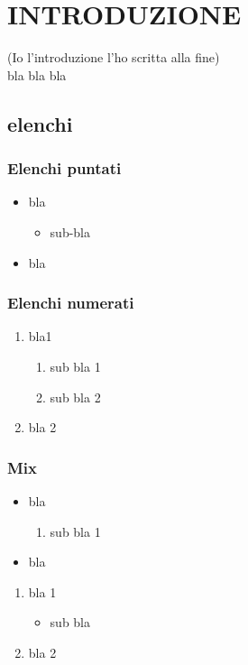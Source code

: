 \documentclass[12pt,a4paper,twoside]{book}
\begin{document}
\chapter{INTRODUZIONE} \label{chap:intro}
\pagestyle{plain}
\setcounter{page}{1}

(Io l'introduzione l'ho scritta alla fine)\\
bla bla bla
\section{elenchi}
\subsection{Elenchi puntati}
\begin{itemize}
    \item bla
    \begin{itemize}
        \item sub-bla
    \end{itemize}
    \item bla
\end{itemize}

\subsection{Elenchi numerati}
\begin{enumerate}
    \item bla1
    \begin{enumerate}
        \item sub bla 1
        \item sub bla 2
    \end{enumerate}
    \item bla 2
\end{enumerate}

\subsection{Mix}
\begin{itemize}
    \item bla
    \begin{enumerate}
        \item sub bla 1
    \end{enumerate}
    \item bla
\end{itemize}

\begin{enumerate}
    \item bla 1
    \begin{itemize}
        \item sub bla
    \end{itemize}
    \item bla 2
\end{enumerate}
\end{document}
